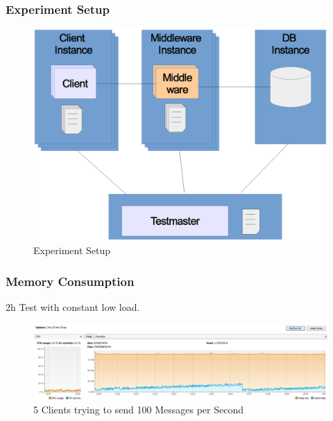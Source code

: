 \documentclass{beamer}
\begin{document}
\begin{frame}
\frametitle{Experiment Setup}
\begin{figure}
  \begin{center}
    \includegraphics[scale=0.4]{../../drawings/testsystem-overview.eps}
  \end{center}
  \caption{Experiment Setup}
  \label{fig:testsystem}
\end{figure}
\end{frame}




\begin{frame}
\frametitle{Memory Consumption}

2h Test with constant low load.
\begin{figure}
  \begin{center}
    \includegraphics[scale=0.6]{5clientsAt100msPerSecond.PNG}
  \end{center}
  \caption{5 Clients trying to send 100 Messages per Second}
  \label{fig:testsystem}
\end{figure}

\end{frame}
\end{document}
